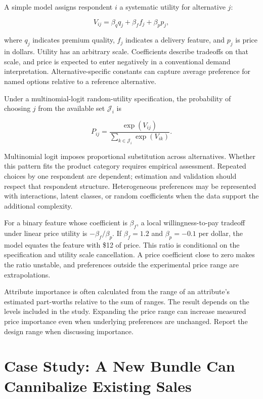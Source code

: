 \noindent A simple model assigns respondent \(i\) a systematic utility for
alternative \(j\):

\[
V_{ij}=\beta_q q_j+\beta_f f_j+\beta_p p_j,
\]

where \(q_j\) indicates premium quality, \(f_j\) indicates a delivery
feature, and \(p_j\) is price in dollars. Utility has an arbitrary
scale. Coefficients describe tradeoffs on that scale, and price is
expected to enter negatively in a conventional demand interpretation.
Alternative-specific constants can capture average preference for named
options relative to a reference alternative.

Under a multinomial-logit random-utility specification, the probability
of choosing \(j\) from the available set \(\mathcal J_i\) is

\[
P_{ij}=\frac{\exp(V_{ij})}{\sum_{k\in\mathcal J_i}\exp(V_{ik})}.
\]

Multinomial logit imposes proportional substitution across alternatives.
Whether this pattern fits the product category requires empirical
assessment. Repeated choices by one respondent are dependent; estimation
and validation should respect that respondent structure. Heterogeneous
preferences may be represented with interactions, latent classes, or
random coefficients when the data support the additional complexity.

For a binary feature whose coefficient is \(\beta_f\), a local
willingness-to-pay tradeoff under linear price utility is
\(-\beta_f/\beta_p\). If \(\beta_f=1.2\) and \(\beta_p=-0.1\) per
dollar, the model equates the feature with \$12 of price. This ratio is
conditional on the specification and utility scale cancellation. A price
coefficient close to zero makes the ratio unstable, and preferences
outside the experimental price range are extrapolations.

Attribute importance is often calculated from the range of an
attribute's estimated part-worths relative to the sum of ranges. The
result depends on the levels included in the study. Expanding the price
range can increase measured price importance even when underlying
preferences are unchanged. Report the design range when discussing
importance.

\hypertarget{M04-case-study-a-new-bundle-can-cannibalize-existing-sales}{%
\section{Case Study: A New Bundle Can Cannibalize Existing
Sales}\label{M04-case-study-a-new-bundle-can-cannibalize-existing-sales}}


